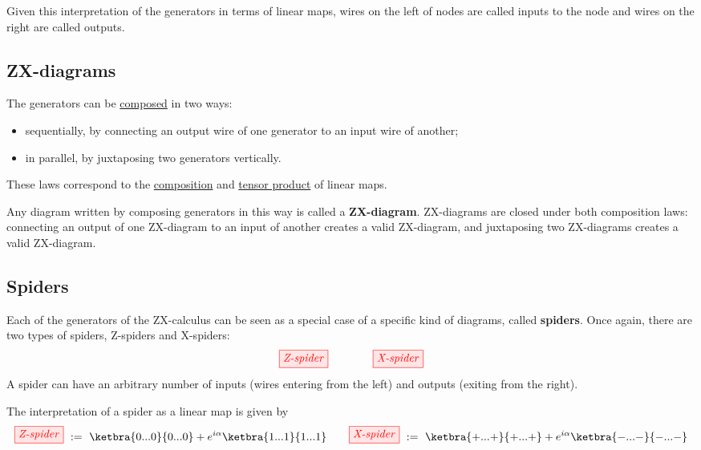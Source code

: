 \documentclass[a4paper, 12pt]{article}
\begin{document}
Given this interpretation of the generators in terms of linear maps, wires on
the left of nodes are called inputs to the node and wires
on the right are called outputs.



\subsection{ZX-diagrams}

The generators can be \underline{composed} in two ways:
\begin{itemize}
\item sequentially, by connecting an output wire of one generator to an input
  wire of another;
\item in parallel, by juxtaposing two generators vertically.
\end{itemize}
These laws correspond to the \underline{composition} and \underline{tensor
  product} of linear maps.

Any diagram written by composing generators in this way is called a
\textbf{ZX-diagram}.
ZX-diagrams are closed under both composition laws: connecting
an output of one ZX-diagram to an input of another creates a valid ZX-diagram,
and juxtaposing two ZX-diagrams creates a valid ZX-diagram.


\subsection{Spiders}

Each of the generators of the ZX-calculus can be seen as a special case of a
specific kind of diagrams, called \textbf{spiders}.
Once again, there are two types of spiders, Z-spiders and X-spiders:
\begin{equation*}
    \tikzfig{Z-spider} \qquad \qquad \tikzfig{X-spider}
\end{equation*}
A spider can have an arbitrary number of inputs (wires entering from the left)
and outputs (exiting from the right).

The interpretation of a spider as a linear map is given by
\begin{equation*}
    \tikzfig{Z-spider}\ := \ \ketbra{0...0}{0...0} +
e^{i \alpha} \ketbra{1...1}{1...1} \hfill
\qquad
\hfill \tikzfig{X-spider} \ := \ \ketbra{+...+}{+...+} +
e^{i \alpha} \ketbra{-...-}{-...-}
\end{equation*}
\end{document}
